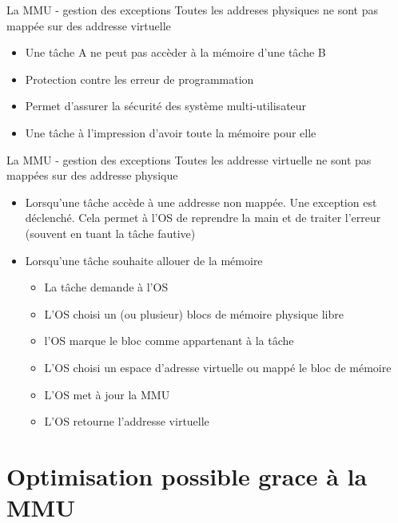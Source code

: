 \begin{frame}{La MMU - gestion des exceptions}
  Toutes les  addreses physiques ne  sont pas mappée sur  des addresse
  virtuelle
  \begin{itemize} 
  \item Une tâche A ne peut pas accèder à la mémoire d'une tâche B
  \item Protection contre les erreur de programmation
  \item Permet d'assurer la sécurité des système multi-utilisateur
  \item Une tâche à l'impression d'avoir toute la mémoire pour elle
  \end{itemize} 
\end{frame} 

\begin{frame}{La MMU - gestion des exceptions}
  Toutes les addresse  virtuelle ne sont pas mappées  sur des addresse
  physique
  \begin{itemize}
  \item  Lorsqu'une  tâche accède  à  une  addresse  non mappée.   Une
    exception est déclenché.  Cela permet  à l'OS de reprendre la main
    et de traiter l'erreur (souvent en tuant la tâche fautive)
  \item Lorsqu'une tâche souhaite allouer de la mémoire
    \begin{itemize}
    \item  La tâche demande à l'OS
    \item L'OS choisi un (ou plusieur) blocs de mémoire physique libre
    \item l'OS marque le bloc comme appartenant à la tâche
    \item L'OS choisi  un espace d'adresse virtuelle ou  mappé le bloc
      de mémoire
    \item L'OS met à jour la MMU
    \item L'OS retourne l'addresse virtuelle
    \end{itemize} 
  \end{itemize} 
\end{frame} 

\section{Optimisation possible grace à la MMU}

